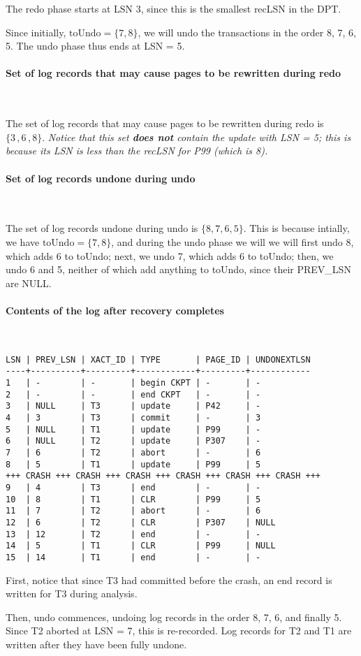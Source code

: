 The redo phase starts at LSN 3, since this is the smallest recLSN in the DPT.
\smallskip

Since initially, $\text{toUndo} = \{7, 8\}$, we will undo the transactions in the
order 8, 7, 6, 5. The undo phase thus ends at LSN = 5.

\paragraph{Set of log records that may cause pages to be rewritten during redo}~\smallskip

The set of log records that may cause pages to be rewritten during redo is
$\{3\, , 6\, , 8\}$. \textit{Notice that this set \textbf{does not} contain the update
with LSN = 5; this is because its LSN is less than the recLSN for P99 (which is
8).}


\paragraph{Set of log records undone during undo}~\smallskip

The set of log records undone during undo is $\{8, 7, 6, 5\}$. This is because
intially, we have $\text{toUndo} = \{7, 8\}$, and during the undo phase we will
we will first undo 8, which adds 6 to toUndo; next, we undo 7, which adds 6 to
toUndo; then, we undo 6 and 5, neither of which add anything to toUndo, since
their PREV\_LSN are NULL.

\paragraph{Contents of the log after recovery completes}~\smallskip

\begin{verbatim}
LSN | PREV_LSN | XACT_ID | TYPE       | PAGE_ID | UNDONEXTLSN
----+----------+---------+------------+---------+------------
1   | -        | -       | begin CKPT | -       | -
2   | -        | -       | end CKPT   | -       | -
3   | NULL     | T3      | update     | P42     | -
4   | 3        | T3      | commit     | -       | 3
5   | NULL     | T1      | update     | P99     | -
6   | NULL     | T2      | update     | P307    | -
7   | 6        | T2      | abort      | -       | 6
8   | 5        | T1      | update     | P99     | 5
+++ CRASH +++ CRASH +++ CRASH +++ CRASH +++ CRASH +++ CRASH +++
9   | 4        | T3      | end        | -       | -
10  | 8        | T1      | CLR        | P99     | 5
11  | 7        | T2      | abort      | -       | 6
12  | 6        | T2      | CLR        | P307    | NULL
13  | 12       | T2      | end        | -       | -
14  | 5        | T1      | CLR        | P99     | NULL
15  | 14       | T1      | end        | -       | -
\end{verbatim}

First, notice that since T3 had committed before the crash, an end record is
written for T3 during analysis.
\smallskip

Then, undo commences, undoing log records in the order 8, 7, 6, and finally 5.
Since T2 aborted at LSN = 7, this is re-recorded. Log records for T2 and T1 are
written after they have been fully undone.

\Sectend
